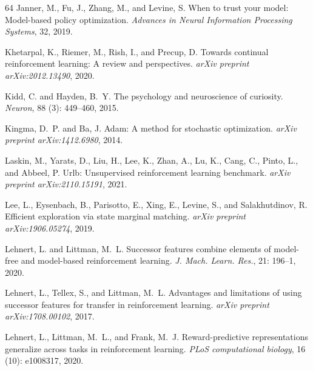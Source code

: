 \documentclass{article}
\theoremstyle{plain}
\theoremstyle{definition}
\theoremstyle{remark}
\begin{document}
\begin{thebibliography}{64}
Janner, M., Fu, J., Zhang, M., and Levine, S.
\newblock When to trust your model: Model-based policy optimization.
\newblock \emph{Advances in Neural Information Processing Systems}, 32, 2019.

Khetarpal, K., Riemer, M., Rish, I., and Precup, D.
\newblock Towards continual reinforcement learning: A review and perspectives.
\newblock \emph{arXiv preprint arXiv:2012.13490}, 2020.

Kidd, C. and Hayden, B.~Y.
\newblock The psychology and neuroscience of curiosity.
\newblock \emph{Neuron}, 88 (3): 449--460, 2015.

Kingma, D.~P. and Ba, J.
\newblock Adam: A method for stochastic optimization.
\newblock \emph{arXiv preprint arXiv:1412.6980}, 2014.

Laskin, M., Yarats, D., Liu, H., Lee, K., Zhan, A., Lu, K., Cang, C., Pinto,
  L., and Abbeel, P.
\newblock Urlb: Unsupervised reinforcement learning benchmark.
\newblock \emph{arXiv preprint arXiv:2110.15191}, 2021.

Lee, L., Eysenbach, B., Parisotto, E., Xing, E., Levine, S., and Salakhutdinov,
  R.
\newblock Efficient exploration via state marginal matching.
\newblock \emph{arXiv preprint arXiv:1906.05274}, 2019.

Lehnert, L. and Littman, M.~L.
\newblock Successor features combine elements of model-free and model-based
  reinforcement learning.
\newblock \emph{J. Mach. Learn. Res.}, 21: 196--1, 2020.

Lehnert, L., Tellex, S., and Littman, M.~L.
\newblock Advantages and limitations of using successor features for transfer
  in reinforcement learning.
\newblock \emph{arXiv preprint arXiv:1708.00102}, 2017.

Lehnert, L., Littman, M.~L., and Frank, M.~J.
\newblock Reward-predictive representations generalize across tasks in
  reinforcement learning.
\newblock \emph{PLoS computational biology}, 16 (10):
  e1008317, 2020.


\end{thebibliography}
\end{document}

